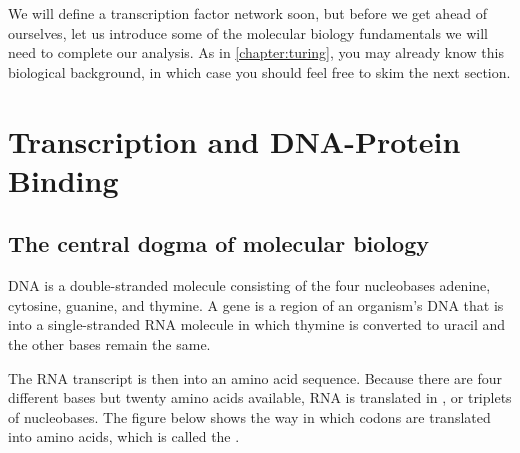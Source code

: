 We will define a transcription factor network soon, but before we get ahead of ourselves, let us introduce some of the molecular biology fundamentals we will need to complete our analysis. As in \autoref{chapter:turing}, you may already know this biological background, in which case you should feel free to skim the next section.

\FloatBarrier
{}

\section{Transcription and DNA-Protein Binding}
\label{sec:transcription_and_dna-protein_binding}

\subsection{The central dogma of molecular biology}

DNA is a double-stranded molecule consisting of the four nucleobases adenine, cytosine, guanine, and thymine. A gene is a region of an organism's DNA that is  into a single-stranded RNA molecule in which thymine is converted to uracil and the other bases remain the same.

The RNA transcript is then  into an amino acid sequence. Because there are four different bases but twenty amino acids available, RNA is translated in , or triplets of nucleobases. The figure below shows the way in which codons are translated into amino acids, which is called the .

